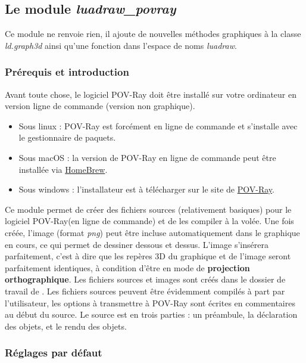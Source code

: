 \subsection{Le module \emph{luadraw\_povray}}

\newcommand*{\povray}{POV-Ray\xspace}%

Ce module ne renvoie rien, il ajoute de nouvelles méthodes graphiques à la classe \emph{ld.graph3d} ainsi qu'une fonction dans l'espace de noms \emph{luadraw}.

\subsubsection{Prérequis et introduction}
Avant toute chose, le logiciel \povray doit être installé sur votre ordinateur en version ligne de commande (version non graphique).
\begin{itemize}
    \item Sous linux : \povray est forcément en ligne de commande et s'installe avec le gestionnaire de paquets.
    \item Sous macOS : la version de \povray en ligne de commande peut être installée via \href{https://formulae.brew.sh/formula/povray\#default)}{HomeBrew}.
    \item Sous windows : l'installateur est à télécharger sur le site de \href{https://www.povray.org/download/}{\povray}.
\end{itemize}


Ce module permet de créer des fichiers sources (relativement basiques) pour le logiciel \povray (en ligne de commande) et de les compiler à la volée. Une fois créée, l'image (format \emph{png}) peut être incluse automatiquement dans le graphique en cours, ce qui permet de dessiner dessous et dessus. L'image s'insérera parfaitement, c'est à dire que les repères 3D du graphique et de l'image seront parfaitement identiques, à condition d'être en mode de \textbf{projection orthographique}. Les fichiers sources et images sont créés dans le dossier de travail de \luadrawenv. Les fichiers sources peuvent être évidemment compilés à part par l'utilisateur, les options à transmettre à \povray sont écrites en commentaires au début du source. Le source est en trois parties : un préambule, la déclaration des objets, et le rendu des objets.

\subsubsection{Réglages par défaut}

